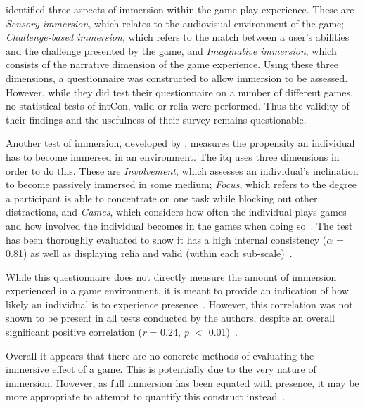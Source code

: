 \citet{Ermi05} identified three aspects of immersion within the game-play experience. These are \textit{Sensory immersion}, which relates to the audiovisual environment of the game; \textit{Challenge-based immersion}, which refers to the match between a user's abilities and the challenge presented by the game, and \textit{Imaginative immersion}, which consists of the narrative dimension of the game experience. Using these three dimensions, a questionnaire was constructed to allow immersion to be assessed. However, while they did test their questionnaire on a number of different games, no statistical tests of \gls{intCon}, \gls{valid} or \gls{relia} were performed. Thus the validity of their findings and the usefulness of their survey remains questionable.

Another test of immersion, developed by \citet{Witm98}, measures the propensity an individual has to become immersed in an environment. The \gls{itq} uses three dimensions in order to do this. These are \textit{Involvement}, which assesses an individual's inclination to become passively immersed in some medium; \textit{Focus}, which refers to the degree a participant is able to concentrate on one task while blocking out other distractions, and \textit{Games}, which considers how often the individual plays games and how involved the individual becomes in the games when doing so~\citep{Witm98}. The test has been thoroughly evaluated to show it has a high internal consistency ($\alpha$ = 0.81) as well as displaying \gls{relia} and \gls{valid} (within each sub-scale)~\citep{Witm98}. 

While this questionnaire does not directly measure the amount of immersion experienced in a game environment, it is meant to provide an indication of how likely an individual is to experience presence~\citep{Witm98}. However, this correlation was not shown to be present in all tests conducted by the authors, despite an overall significant positive correlation (\emph{r} = 0.24, \emph{p} $<$ 0.01)~\citep{Witm98}.

Overall it appears that there are no concrete methods of evaluating the immersive effect of a game. This is potentially due to the very nature of immersion. However, as full immersion has been equated with presence, it may be more appropriate to attempt to quantify this construct instead~\citep{Brow04}.


